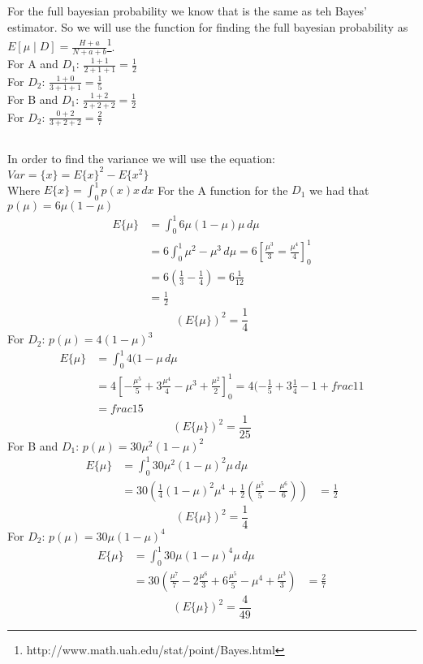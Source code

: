\subsection{}
For the full bayesian probability we know that is the same as teh Bayes' estimator.
So we will use the function for finding the full bayesian probability as $E[\mu\mid D] = \frac{H+a}{N+a+b}$\footnote{http://www.math.uah.edu/stat/point/Bayes.html}.\\
For A and $D_1$: $\frac{1+1}{2+1+1} = \frac{1}{2}$\\
For $D_2$: $\frac{1+0}{3+1+1} = \frac{1}{5}$\\
For B and $D_1$: $\frac{1+2}{2+2+2} = \frac{1}{2}$\\
For $D_2$: $\frac{0+2}{3+2+2} = \frac{2}{7}$\\
\subsection{}
In order to find the variance we will use the equation:\\
$Var = \{x\} = E\{x\}^2 - E\{x^2\}$\\
Where $E\{x\} = \int_0^1 p(x)x \,dx$
For the A function for the $D_1$ we had that $p(\mu) = 6\mu(1-\mu)$
\begin{align*}
E\{\mu\} &= \int_0^1 6\mu(1-\mu)\mu \,d\mu \\
&= 6 \int_0^1 \mu^2-\mu^3 \,d\mu
 = 6 [\frac{\mu^3}{3} = \frac{\mu^4}{4}]_0^1 \\
&= 6 (\frac{1}{3} - \frac{1}{4})
 = 6 \frac{1}{12} \\
&= \frac{1}{2}
\end{align*}
\begin{equation*}
(E\{\mu\})^2 = \frac{1}{4}
\end{equation*}
For $D_2$: $p(\mu) = 4(1-\mu)^3$
\begin{align*}
E\{\mu\} &= \int_0^1 4(1-\mu \,d\mu \\
&= 4 [-\frac{\mu^5}{5} + 3\frac{\mu^4}{4} - \mu^3 + \frac{\mu^2}{2}]_0^1
= 4 (-\frac{1}{5} + 3\frac{1}{4}  -1 + frac{1}{1} \\
&= frac{1}{5}
\end{align*}
\begin{equation*}
(E\{\mu\})^2 = \frac{1}{25}
\end{equation*}
For B and $D_1$: $p(\mu) = 30\mu^2(1-\mu)^2$
\begin{align*}
E\{\mu\} &= \int_0^1 30\mu^2(1-\mu)^2\mu \,d\mu \\
&= 30 (\frac{1}{4}(1-\mu)^2\mu^4 + \frac{1}{2}(\frac{\mu^5}{5} - \frac{\mu^6}{6}))
&= \frac{1}{2}
\end{align*}
\begin{equation*}
(E\{\mu\})^2 = \frac{1}{4}
\end{equation*}
For $D_2$: $p(\mu) = 30\mu(1-\mu)^4$
\begin{align*}
E\{\mu\} &= \int_0^1 30\mu(1-\mu)^4\mu \,d\mu \\
&= 30 (\frac{\mu^7}{7} - 2\frac{\mu^6}{3} + 6\frac{\mu^5}{5} - \mu^4 + \frac{\mu^3}{3})
&= \frac{2}{7}
\end{align*}
\begin{equation*}
(E\{\mu\})^2 = \frac{4}{49}
\end{equation*}
